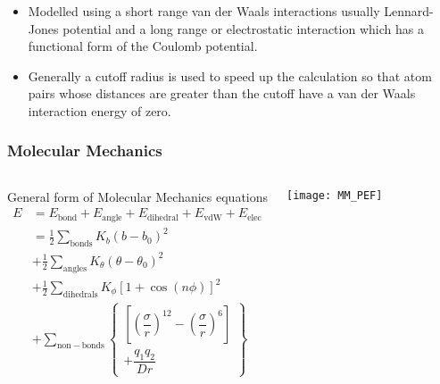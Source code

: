 \documentclass[slidestop,mathserif,compress,xcolor=svgnames]{beamer}
\begin{document}
\begin{frame}[allowframebreaks]
{\begin{itemize}
\item Modelled using a short range van der Waals interactions usually Lennard-Jones potential and a long range or electrostatic interaction which has a functional form of the Coulomb potential.
\item Generally a cutoff radius is used to speed up the calculation so that atom pairs whose distances are greater than the cutoff have a van der Waals interaction energy of zero.
\end{itemize}
}
\end{frame}

\begin{frame}
\frametitle{\small Molecular Mechanics}
\footnotesize{
\begin{columns}
\column{5.5cm}
\vspace{-0.5cm}
\begin{block}{General form of Molecular Mechanics equations}
\begin{align*}
E&=E_{\mathrm{bond}}+E_{\mathrm{angle}} + E_{\mathrm{dihedral}} + E_{\mathrm{vdW}} + E_{\mathrm{elec}}\\
&=\frac{1}{2}\sum_{\mathrm{bonds}}K_b(b-b_0)^2\\
&+\frac{1}{2}\sum_{\mathrm{angles}}K_\theta(\theta-\theta_0)^2\\
&+\frac{1}{2}\sum_{\mathrm{dihedrals}}K_\phi\left[1+\cos(n\phi)\right]^2\\
&+\sum_{\mathrm{non-bonds}}\left\{ \begin{array}{l}
\left[\left(\dfrac{\sigma}{r}\right)^{12}-\left(\dfrac{\sigma}{r}\right)^{6}\right] \\
+ \dfrac{q_1q_2}{Dr}
       \end{array} \right\}
\end{align*}
\end{block}
\column{5.5cm}
\vspace{0.5cm}
\begin{block}{}
\texttt{[image: MM\_PEF]}
\end{block}
\end{columns}
}
\end{frame}
\end{document}
